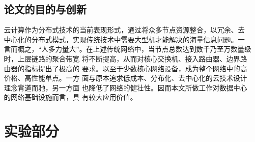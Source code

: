 \documentclass[bachelor,winfonts]{jnuthesis} %
\begin{document}
    \section{论文的目的与创新}
    云计算作为分布式技术的当前表现形式，通过将众多节点资源整合，以冗余、去
    中心化的分布式模式，实现传统技术中需要大型机才能解决的海量信息问题。一
    言而概之，“人多力量大”。在上述传统网络中，当节点总数达到数千乃至万数量级时，上层链路的聚合带宽
    将不断提高，从而对核心交换机、接入路由器、边界路由器的指标提出了极高的
    要求。以至于少数核心网络设备，成为整个网络中的高价格、高性能单点。一方
    面与原本追求低成本、分布化、去中心化的云技术设计理念背道而驰，另一方面
    也降低了网络的健壮性。因而本文所做工作对数据中心的网络基础设施而言，具
    有较大应用价值。
    
    \chapter{实验部分}\label{chapter:experiment}
\end{document}
